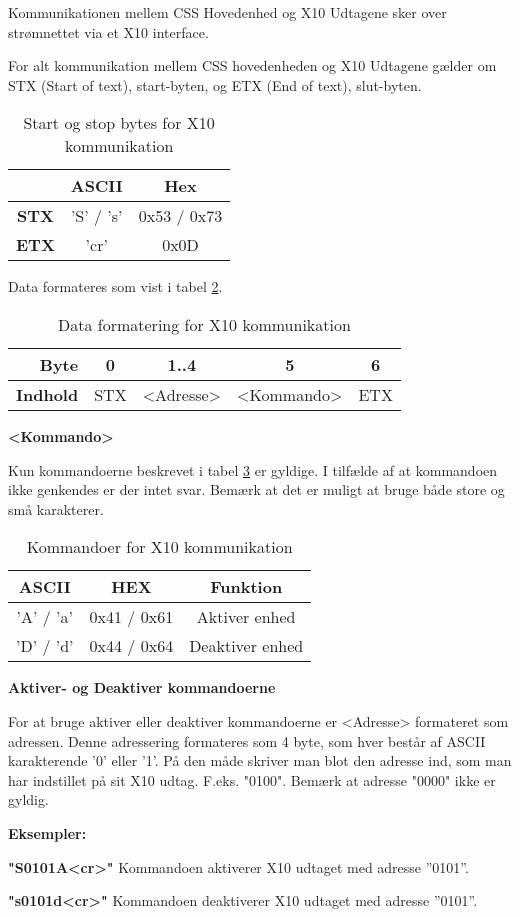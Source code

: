 Kommunikationen mellem CSS Hovedenhed og X10 Udtagene sker over strømnettet via et X10 interface.

For alt kommunikation mellem CSS hovedenheden og X10 Udtagene gælder om STX (Start of text), start-byten, og ETX (End of text), slut-byten.

\begin{table}[h]
	\caption{Start og stop bytes for X10 kommunikation}
	\centering
	\begin{tabular}{|c|c|c|}
		\hline 
		& ASCII & Hex \\ 
		\hline 
		\textbf{STX} & 'S' / 's' & 0x53 / 0x73 \\ 
		\hline 
		\textbf{ETX} & 'cr' & 0x0D \\ 
		\hline 
	\end{tabular} 
	\label{table:X10StartStopBytes}
\end{table}

Data formateres som vist i tabel \ref{table:X10DataFormat}.

\begin{table}[h]
	\caption{Data formatering for X10 kommunikation}
	\centering
	\begin{tabular}{|r|c|c|c|c|}
		\hline 
		\textbf{Byte} & 0 & 1..4 & 5 & 6 \\ 
		\hline 
		\textbf{Indhold} & STX & <Adresse> & <Kommando> & ETX \\ 
		\hline 
	\end{tabular} 
	\label{table:X10DataFormat}
\end{table}

\textbf{<Kommando>}

Kun kommandoerne beskrevet i tabel \ref{tabel:X10Kommandoer} er gyldige. I tilfælde af at kommandoen ikke genkendes er der intet svar. Bemærk at det er muligt at bruge både store og små karakterer.

\begin{table}[h]
\caption{Kommandoer for X10 kommunikation}
\centering
\begin{tabular}{|c|c|c|}
\hline 
\textbf{ASCII} & \textbf{HEX} & \textbf{Funktion} \\ 
\hline 
'A' / 'a' & 0x41 / 0x61 & Aktiver enhed \\ 
\hline 
'D' / 'd' & 0x44 / 0x64 & Deaktiver enhed \\ 
\hline
\end{tabular}
\label{tabel:X10Kommandoer}
\end{table} 

\textbf{Aktiver- og Deaktiver kommandoerne}

For at bruge aktiver eller deaktiver kommandoerne er <Adresse> formateret som adressen. Denne adressering formateres som 4 byte, som hver består af ASCII karakterende '0' eller '1'. På den måde skriver man blot den adresse ind, som man har indstillet på sit X10 udtag. F.eks. "0100".
Bemærk at adresse "0000" ikke er gyldig.

\textbf{Eksempler:}

\textbf{"S0101A<cr>"}
Kommandoen aktiverer X10 udtaget med adresse ''0101''.

\textbf{"s0101d<cr>"}
Kommandoen deaktiverer X10 udtaget med adresse ''0101''.

